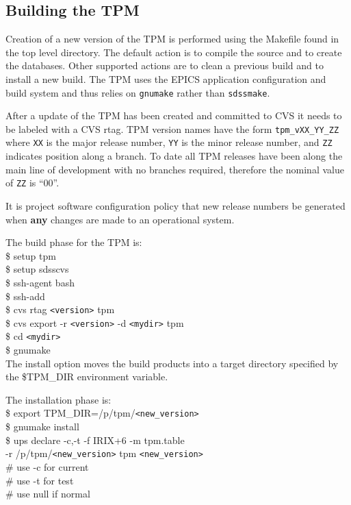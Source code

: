 \subsection{Building the TPM}

Creation of a new version of the TPM is performed using the
Makefile found in the top level directory. The default action
is to compile the source and to create the databases. Other
supported actions are to clean a previous build and to install
a new build. The TPM uses the EPICS application configuration
and build system and thus relies on {\tt gnumake} rather than 
{\tt sdssmake}.

After a update of the TPM has been created and committed to
CVS it needs to be labeled with a CVS rtag.
TPM version names have the form
{\tt tpm\_vXX\_YY\_ZZ} where {\tt XX} is the major release
number, {\tt YY} is the minor release number, and {\tt ZZ}
indicates position along a branch. To date all TPM releases
have been along the main line of development with no
branches required, therefore the nominal value of {\tt ZZ} is ``00''.

It is project software configuration policy that new release
numbers be generated when {\bf any} changes are made to an
operational system.

The build phase for the TPM is:\\
\$ setup tpm \\
\$ setup sdsscvs \\

\$ ssh-agent bash \\
\$ ssh-add \\

\$ cvs rtag {\tt <version>} tpm \\

\$ cvs export -r {\tt <version>} -d {\tt <mydir>} tpm \\
\$ cd {\tt <mydir>} \\
\$ gnumake \\

The install option moves the build products into a target
directory specified by the \$TPM\_DIR environment
variable. 

The installation phase is:\\
\$ export TPM\_DIR=/p/tpm/{\tt<new\_version>} \\

\$ gnumake install \\
\$ ups declare {-c,-t} -f IRIX+6 -m tpm.table \\
-r /p/tpm/{\tt<new\_version>} tpm {\tt<new\_version>} \\
\# use -c for current \\
\# use -t for test \\
\# use null if normal \\

